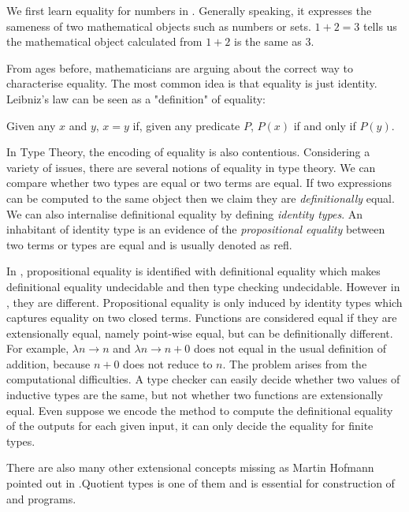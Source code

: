 We first learn equality for numbers in \maths. Generally speaking, it
expresses the sameness of two mathematical objects such as numbers or sets.
$1+2=3$ tells us the mathematical object calculated from $1+2$ is the
same as $3$.

From ages before, mathematicians are arguing about the correct way to
characterise equality. The most common idea is that equality is just
identity. Leibniz's law can be seen as a "definition" of
equality:

Given any $x$ and $y$, $x = y$ if, given any predicate $P$, $P(x)$ if and only
if $P(y)$.

In Type Theory, the encoding of equality is also contentious. Considering a variety of issues, there are
several notions of equality in type theory.
We can compare whether two types are equal or two terms are equal. If two
expressions can be computed to the same object then we claim they are
 \emph{definitionally} equal.  
 We can also internalise definitional equality by defining \emph{identity types}. An inhabitant of identity type is an evidence of the \emph{propositional equality} between two terms or types are equal and is usually denoted as refl. 

In \ett, propositional equality is identified with definitional equality which makes definitional equality undecidable and then type checking undecidable. However in \itt, they are different. Propositional equality is only induced by identity types which captures equality on two closed terms. 
Functions are considered equal if they are extensionally equal, namely point-wise equal, but can be definitionally different. For example, $\lambda n \to n$ and $\lambda n \to n + 0$ does not equal in the usual definition of addition, because $n+0$ does not reduce to $n$.
The problem arises from the computational difficulties. A type checker can easily decide whether two
values of inductive types are the same, but not whether two functions
are extensionally equal. Even suppose we encode the method to compute
the definitional equality of the outputs for each given input, it can
only decide the equality for finite types.

There are also many other extensional concepts missing as Martin Hofmann pointed out in \cite{hof:phd}.Quotient types is one of them and is essential for construction of \maths and programs.


